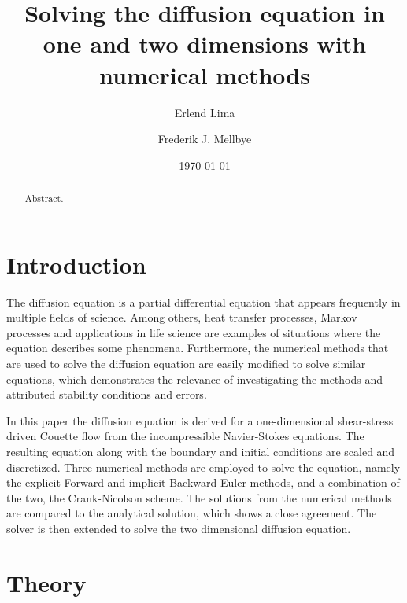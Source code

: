 \documentclass[aps,reprint]{revtex4-1}
\begin{document}
\title{Solving the diffusion equation in one and two dimensions with numerical methods}
\author{Erlend Lima}
\author{Frederik J. Mellbye}
\date{\today}

\begin{abstract}
Abstract.
\end{abstract}
\maketitle
\tableofcontents
\makeatletter
\let\toc@pre\relax
\let\toc@post\relax
\makeatother

\newpage

\section{Introduction} \label{sec:introduction}
The diffusion equation is a partial differential equation that appears frequently in
multiple fields of science. Among others, heat transfer processes, Markov processes
and applications in life science are examples of situations where the equation describes
some phenomena. Furthermore, the numerical methods that are used to solve the diffusion
equation are easily modified to solve similar equations, which demonstrates the relevance
of investigating the methods and attributed stability conditions and errors.

In this paper the diffusion equation is derived for a one-dimensional shear-stress
driven Couette flow from the incompressible Navier-Stokes equations. The resulting
equation along with the boundary and initial conditions are scaled and discretized.
Three numerical methods are employed to solve the equation, namely the explicit Forward and
implicit Backward Euler methods, and a combination of the two, the Crank-Nicolson scheme.
The solutions from the numerical methods are compared to the analytical solution, which
shows a close agreement. The solver is then extended to solve the two dimensional
diffusion equation.
\section{Theory} \label{sec:theory}
\end{document}
